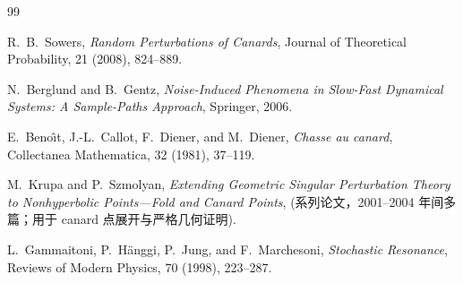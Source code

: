 	
	\begin{thebibliography}{99}
		
		R.\ B.\ Sowers,
		\newblock \textit{Random Perturbations of Canards},
		\newblock Journal of Theoretical Probability, 21 (2008), 824--889.
		
		N.\ Berglund and B.\ Gentz,
		\newblock \textit{Noise-Induced Phenomena in Slow-Fast Dynamical Systems: A Sample-Paths Approach},
		\newblock Springer, 2006.
		
		E.\ Beno\^{\i}t, J.-L.\ Callot, F.\ Diener, and M.\ Diener,
		\newblock \textit{Chasse au canard},
		\newblock Collectanea Mathematica, 32 (1981), 37--119.
		
		M.\ Krupa and P.\ Szmolyan,
		\newblock \textit{Extending Geometric Singular Perturbation Theory to Nonhyperbolic Points---Fold and Canard Points},
		\newblock (系列论文，2001--2004 年间多篇；用于 canard 点展开与严格几何证明).
		
		L.\ Gammaitoni, P.\ H\"anggi, P.\ Jung, and F.\ Marchesoni,
		\newblock \textit{Stochastic Resonance},
		\newblock Reviews of Modern Physics, 70 (1998), 223--287.
		
	\end{thebibliography}
	
	
	

